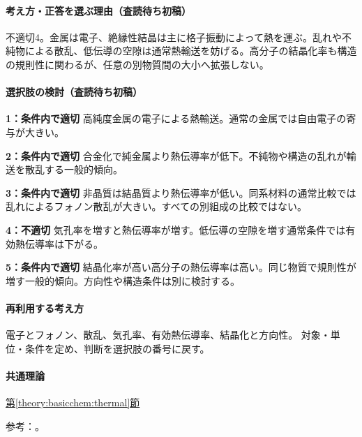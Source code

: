 \paragraph{考え方・正答を選ぶ理由（査読待ち初稿）} 不適切4。金属は電子、絶縁性結晶は主に格子振動によって熱を運ぶ。乱れや不純物による散乱、低伝導の空隙は通常熱輸送を妨げる。高分子の結晶化率も構造の規則性に関わるが、任意の別物質間の大小へ拡張しない。

\paragraph{選択肢の検討（査読待ち初稿）}\mbox{}\par

\noindent\textbf{1：条件内で適切} 高純度金属の電子による熱輸送。通常の金属では自由電子の寄与が大きい。\par

\noindent\textbf{2：条件内で適切} 合金化で純金属より熱伝導率が低下。不純物や構造の乱れが輸送を散乱する一般的傾向。\par

\noindent\textbf{3：条件内で適切} 非晶質は結晶質より熱伝導率が低い。同系材料の通常比較では乱れによるフォノン散乱が大きい。すべての別組成の比較ではない。\par

\noindent\textbf{4：不適切} 気孔率を増すと熱伝導率が増す。低伝導の空隙を増す通常条件では有効熱伝導率は下がる。\par

\noindent\textbf{5：条件内で適切} 結晶化率が高い高分子の熱伝導率は高い。同じ物質で規則性が増す一般的傾向。方向性や構造条件は別に検討する。\par

\paragraph{再利用する考え方} 電子とフォノン、散乱、気孔率、有効熱伝導率、結晶化と方向性。 対象・単位・条件を定め、判断を選択肢の番号に戻す。

\paragraph{共通理論} \hyperref[theory:basicchem:thermal]{第\ref*{theory:basicchem:thermal}節}

\par 参考：\cite{aist_metal_thermal,openstax_thermal_conduction,chem55_polymer}。

